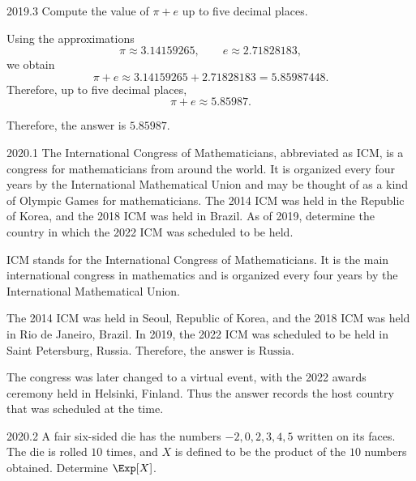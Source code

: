     \begin{pastproblem}{2019.3}
        Compute the value of $\pi+e$ up to five decimal places.
    \end{pastproblem}

    \begin{solution}
        Using the approximations
        \[
            \pi\approx 3.14159265,
            \qquad
            e\approx 2.71828183,
        \]
        we obtain
        \[
            \pi+e
            \approx
            3.14159265+2.71828183
            =
            5.85987448.
        \]
        Therefore, up to five decimal places,
        \[
            \pi+e\approx 5.85987.
        \]

        Therefore, the answer is $\boxed{5.85987}$.
    \end{solution}

    \begin{pastproblem}{2020.1}
        The International Congress of Mathematicians, abbreviated as ICM, is a congress for
        mathematicians from around the world. It is organized every four years by the International
        Mathematical Union and may be thought of as a kind of Olympic Games for mathematicians. The
        2014 ICM was held in the Republic of Korea, and the 2018 ICM was held in Brazil. As of 2019, determine
        the country in which the 2022 ICM was scheduled to be held.
    \end{pastproblem}

    \begin{solution}
        ICM stands for the International Congress of Mathematicians. It is the main international
        congress in mathematics and is organized every four years by the International Mathematical
        Union.

        The 2014 ICM was held in Seoul, Republic of Korea, and the 2018 ICM was held in Rio de Janeiro,
        Brazil. In 2019, the 2022 ICM was scheduled to be held in Saint Petersburg, Russia.
        Therefore, the answer is $\boxed{\text{Russia}}$.

        The congress was later changed to a virtual event, with the 2022 awards ceremony held in
        Helsinki, Finland. Thus the answer records the host country that was scheduled at the time.
    \end{solution}

    \begin{pastproblem}{2020.2}
        A fair six-sided die has the numbers $-2,0,2,3,4,5$ written on its faces. The die is rolled
        $10$ times, and $X$ is defined to be the product of the $10$ numbers obtained. Determine
        $\Exp[X]$.
    \end{pastproblem}

